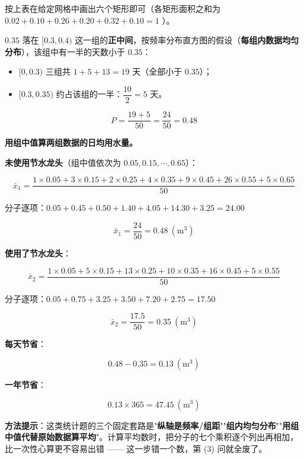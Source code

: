 按上表在给定网格中画出六个矩形即可（各矩形面积之和为 $0.02+0.10+0.26+0.20+0.32+0.10=1$ ）。


$0.35$ 落在 $[0.3,0.4)$ 这一组的\textbf{正中间}，按频率分布直方图的假设（\textbf{每组内数据均匀分布}），该组中有一半的天数小于 $0.35$：

\begin{itemize}
\item $[0,0.3)$ 三组共 $1+5+13=19$ 天（全部小于 $0.35$）；
\item $[0.3,0.35)$ 约占该组的一半：$\dfrac{10}2=5$ 天。
\end{itemize}

\[P=\frac{19+5}{50}=\frac{24}{50}=0.48\]



\textbf{用组中值算两组数据的日均用水量。}

\textbf{未使用节水龙头}（组中值依次为 $0.05,0.15,\cdots,0.65$）：

\[\bar x_1=\frac{1\times0.05+3\times0.15+2\times0.25+4\times0.35+9\times0.45+26\times0.55+5\times0.65}{50}\]

分子逐项：$0.05+0.45+0.50+1.40+4.05+14.30+3.25=24.00$

\[\bar x_1=\frac{24}{50}=0.48\ \left(\mathrm m^{3}\right)\]

\textbf{使用了节水龙头}：

\[\bar x_2=\frac{1\times0.05+5\times0.15+13\times0.25+10\times0.35+16\times0.45+5\times0.55}{50}\]

分子逐项：$0.05+0.75+3.25+3.50+7.20+2.75=17.50$

\[\bar x_2=\frac{17.5}{50}=0.35\ \left(\mathrm m^{3}\right)\]

\textbf{每天节省}：

\[0.48-0.35=0.13\ \left(\mathrm m^{3}\right)\]

\textbf{一年节省}：

\[0.13\times365=47.45\ \left(\mathrm m^{3}\right)\]


\begin{gktip}
\textbf{方法提示}：这类统计题的三个固定套路是"\textbf{纵轴是频率/组距}""\textbf{组内均匀分布}""\textbf{用组中值代替原始数据算平均}"。计算平均数时，把分子的七个乘积逐个列出再相加，比一次性心算更不容易出错 —— 这一步错一个数，第 (3) 问就全废了。
\end{gktip}

